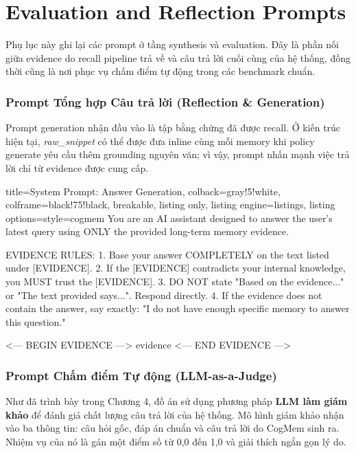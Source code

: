 \documentclass[../main.tex]{subfiles}
\begin{document}
\chapter{Evaluation and Reflection Prompts}

Phụ lục này ghi lại các prompt ở tầng synthesis và evaluation. Đây là phần nối giữa evidence do recall pipeline trả về và câu trả lời cuối cùng của hệ thống, đồng thời cũng là nơi phục vụ chấm điểm tự động trong các benchmark chuẩn.

\subsection{Prompt Tổng hợp Câu trả lời (Reflection \& Generation)}

Prompt generation nhận đầu vào là tập bằng chứng đã được recall. Ở kiến trúc hiện tại, \textit{raw\_snippet} có thể được đưa inline cùng mỗi memory khi policy generate yêu cầu thêm grounding nguyên văn; vì vậy, prompt nhấn mạnh việc trả lời chỉ từ evidence được cung cấp.

\begin{tcblisting}{
title=System Prompt: Answer Generation,
colback=gray!5!white,
colframe=black!75!black,
breakable,
listing only,
listing engine=listings,
listing options={style=cogmem}
}
You are an AI assistant designed to answer
the user's latest query using ONLY the
provided long-term memory evidence.

EVIDENCE RULES:
1. Base your answer COMPLETELY on the text
   listed under [EVIDENCE].
2. If the [EVIDENCE] contradicts your
   internal knowledge, you MUST trust the
   [EVIDENCE].
3. DO NOT state "Based on the evidence..."
   or "The text provided says...".
   Respond directly.
4. If the evidence does not contain the
   answer, say exactly: "I do not have
   enough specific memory to answer this
   question."

<--- BEGIN EVIDENCE --->
{evidence}
<--- END EVIDENCE --->
\end{tcblisting}

\subsection{Prompt Chấm điểm Tự động (LLM-as-a-Judge)}

Như đã trình bày trong Chương 4, đồ án sử dụng phương pháp \textbf{LLM làm giám khảo} để đánh giá chất lượng câu trả lời của hệ thống. Mô hình giám khảo nhận vào ba thông tin: câu hỏi gốc, đáp án chuẩn và câu trả lời do CogMem sinh ra. Nhiệm vụ của nó là gán một điểm số từ 0,0 đến 1,0 và giải thích ngắn gọn lý do.
\end{document}
